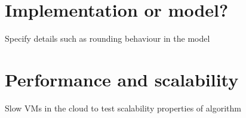 \documentclass[conference]{IEEEtran}
\begin{document}
\section{Implementation or model?}

Specify details such as rounding behaviour in the model

\section{Performance and scalability}

Slow VMs in the cloud to test scalability properties of algorithm

\section{}





\end{document}
